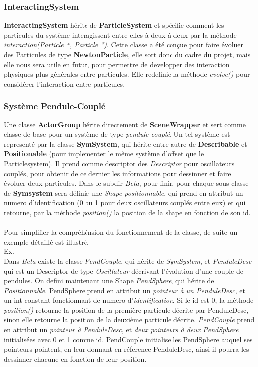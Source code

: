 \documentclass{report}
\begin{document}
\subsubsection{InteractingSystem}

\textbf{InteractingSystem} hérite de \textbf{ParticleSystem} et spécifie comment les particules du système interagissent entre elles à deux à deux par la méthode \textit{interaction(Particle *, Particle *)}.
Cette classe a été conçue pour faire évoluer des Particules de type \textbf{NewtonParticle}, elle sort donc du cadre du projet, mais elle nous sera utile en futur, pour permettre
de developper des interaction physiques plus générales entre particules.
Elle redefinie la méthode \textit{evolve()} pour considérer l'interaction entre particules.

\subsubsection{Système Pendule-Couplé}

Une classe \textbf{ActorGroup} hérite directement de \textbf{SceneWrapper} et sert comme classe de base pour un système de type \textit{pendule-couplé}.
Un tel système est representé par la classe \textbf{SymSystem}, qui hérite entre autre de \textbf{Describable} et \textbf{Positionable} (pour implementer le même système d'offset que le Particlesystem).
Il prend comme descriptor des \textit{Descriptor} pour oscillateurs couplés, pour obtenir de ce dernier les informations pour dessinner et faire évoluer deux particules.
Dans le subdir \textit{Beta}, pour finir, pour chaque sous-classe de \textbf{Symsystem} sera définie une \textit{Shape positionnable}, qui prend en attribut un numero d'identification (0 ou 1 pour deux oscillateurs couplés entre eux)
et qui retourne, par la méthode \textit{position()} la position de la shape en fonction de son id.
	\\
	\\
	Pour simplifier la compréhénsion du fonctionnement de la classe, de suite un exemple détaillé est illustré.
	\\
	Ex.\\ Dans \textit{Beta} existe la classe \textit{PendCouple}, qui hérite de \textit{SymSystem}, et \textit{PenduleDesc} qui est un Descriptor de type \textit{Oscillateur} décrivant l'évolution d'une couple de pendules. 
		On defini maintenant une Shape \textit{PendSphere}, qui hérite de \textit{Positionnable}. PendSphere prend en attribut un \textit{pointeur à un PenduleDesc}, et un int constant fonctionnant de numero d'\textit{identification}.
		Si le id est 0, la méthode \textit{position()} retourne la position de la première particule décrite par PenduleDesc, sinon elle retourne la position de la deuxième particule décrite.
		\textit{PendCouple} prend en attribut un \textit{pointeur à PenduleDesc}, et \textit{deux pointeurs à deux PendSphere} initialisées avec 0 et 1 comme id.
		PendCouple initialise les PendSphere auquel ses pointeurs pointent, en leur donnant en réference PenduleDesc, ainsi il pourra les dessinner chacune en fonction de leur position.
\end{document}
